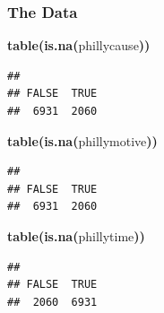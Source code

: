 \documentclass[]{beamer}
\makeatletter
\newcommand{\hlfunctioncall}[1]{\textcolor[rgb]{.5,0,.33}{\textbf{#1}}}%
\newcommand{\hlkeyword}[1]{\textbf{#1}}%
\newcommand{\hlsymbol}[1]{#1}%
\newenvironment{kframe}{%
 \def\FrameCommand##1{\hskip\@totalleftmargin \hskip-\fboxsep
 \colorbox{shadecolor}{##1}\hskip-\fboxsep
     \hskip-\linewidth \hskip-\@totalleftmargin \hskip\columnwidth}%
 \MakeFramed {\advance\hsize-\width
   \@totalleftmargin\z@ \linewidth\hsize
   \@setminipage}}%
 {\par\unskip\endMakeFramed}
\newenvironment{knitrout}{}{} %
\renewenvironment{knitrout}{\begin{footnotesize}}{\end{footnotesize}}
\makeatother
\begin{document}
\begin{frame}[fragile]
	\frametitle{The Data}
\begin{knitrout}
\color{fgcolor}\begin{kframe}
\begin{flushleft}
\ttfamily\noindent
\hlfunctioncall{table}\hlkeyword{(}\hlfunctioncall{is.na}\hlkeyword{(}\hlsymbol{philly}\hlkeyword{\usebox{\hlnormalsizeboxdollar}}\hlsymbol{cause}\hlkeyword{)}\hlkeyword{)}\mbox{}
\normalfont
\end{flushleft}
\begin{verbatim}
## 
## FALSE  TRUE 
##  6931  2060 
\end{verbatim}
\begin{flushleft}
\ttfamily\noindent
\hlfunctioncall{table}\hlkeyword{(}\hlfunctioncall{is.na}\hlkeyword{(}\hlsymbol{philly}\hlkeyword{\usebox{\hlnormalsizeboxdollar}}\hlsymbol{motive}\hlkeyword{)}\hlkeyword{)}\mbox{}
\normalfont
\end{flushleft}
\begin{verbatim}
## 
## FALSE  TRUE 
##  6931  2060 
\end{verbatim}
\begin{flushleft}
\ttfamily\noindent
\hlfunctioncall{table}\hlkeyword{(}\hlfunctioncall{is.na}\hlkeyword{(}\hlsymbol{philly}\hlkeyword{\usebox{\hlnormalsizeboxdollar}}\hlsymbol{time}\hlkeyword{)}\hlkeyword{)}\mbox{}
\normalfont
\end{flushleft}
\begin{verbatim}
## 
## FALSE  TRUE 
##  2060  6931 
\end{verbatim}
\end{kframe}
\end{knitrout}

\end{frame}
\end{document}
